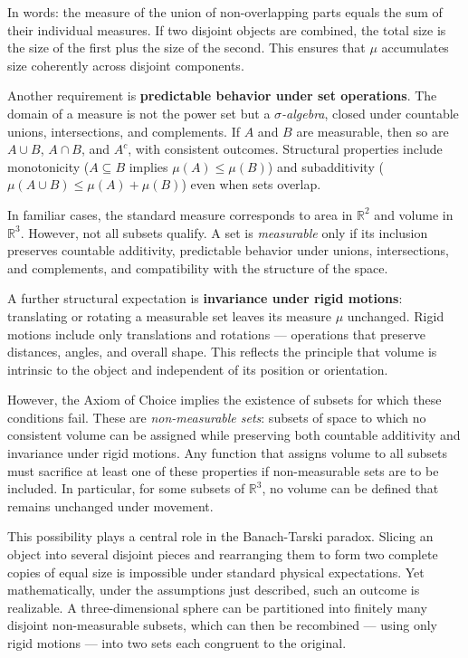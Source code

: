 In words: the measure of the union of non-overlapping parts equals the sum of their individual measures. If two disjoint objects are combined, the total size is the size of the first plus the size of the second. This ensures that $\mu$ accumulates size coherently across disjoint components.

Another requirement is \textbf{predictable behavior under set operations}. The domain of a measure is not the power set but a \emph{$\sigma$-algebra}, closed under countable unions, intersections, and complements. If $A$ and $B$ are measurable, then so are $A \cup B$, $A \cap B$, and $A^c$, with consistent outcomes. Structural properties include monotonicity ($A \subseteq B$ implies $\mu(A) \leq \mu(B)$) and subadditivity ($\mu(A \cup B) \leq \mu(A) + \mu(B)$) even when sets overlap.

In familiar cases, the standard measure corresponds to area in $\mathbb{R}^2$ and volume in $\mathbb{R}^3$. However, not all subsets qualify. A set is \emph{measurable} only if its inclusion preserves countable additivity, predictable behavior under unions, intersections, and complements, and compatibility with the structure of the space.

A further structural expectation is \textbf{invariance under rigid motions}: translating or rotating a measurable set leaves its measure $\mu$ unchanged. Rigid motions include only translations and rotations — operations that preserve distances, angles, and overall shape. This reflects the principle that volume is intrinsic to the object and independent of its position or orientation.

However, the Axiom of Choice implies the existence of subsets for which these conditions fail. These are \emph{non-measurable sets}: subsets of space to which no consistent volume can be assigned while preserving both countable additivity and invariance under rigid motions. Any function that assigns volume to all subsets must sacrifice at least one of these properties if non-measurable sets are to be included. In particular, for some subsets of $\mathbb{R}^3$, no volume can be defined that remains unchanged under movement.

This possibility plays a central role in the Banach-Tarski paradox. Slicing an object into several disjoint pieces and rearranging them to form two complete copies of equal size is impossible under standard physical expectations. Yet mathematically, under the assumptions just described, such an outcome is realizable. A three-dimensional sphere can be partitioned into finitely many disjoint non-measurable subsets, which can then be recombined — using only rigid motions — into two sets each congruent to the original.

